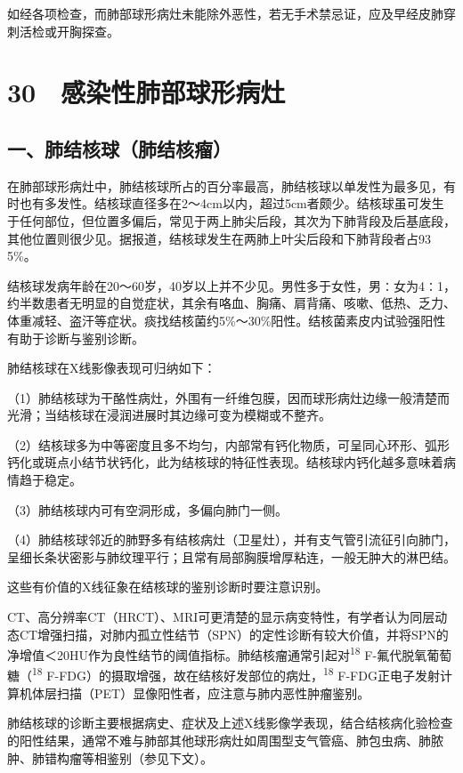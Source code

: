 如经各项检查，而肺部球形病灶未能除外恶性，若无手术禁忌证，应及早经皮肺穿刺活检或开胸探查。

\protect\hypertarget{text00089.html}{}{}

\section{30　感染性肺部球形病灶}

\subsection{一、肺结核球（肺结核瘤）}

在肺部球形病灶中，肺结核球所占的百分率最高，肺结核球以单发性为最多见，有时也有多发性。结核球直径多在2～4cm以内，超过5cm者颇少。结核球虽可发生于任何部位，但位置多偏后，常见于两上肺尖后段，其次为下肺背段及后基底段，其他位置则很少见。据报道，结核球发生在两肺上叶尖后段和下肺背段者占93
5\%。

结核球发病年龄在20～60岁，40岁以上并不少见。男性多于女性，男∶女为4∶1，约半数患者无明显的自觉症状，其余有咯血、胸痛、肩背痛、咳嗽、低热、乏力、体重减轻、盗汗等症状。痰找结核菌约5\%～30\%阳性。结核菌素皮内试验强阳性有助于诊断与鉴别诊断。

肺结核球在X线影像表现可归纳如下：

（1）肺结核球为干酪性病灶，外围有一纤维包膜，因而球形病灶边缘一般清楚而光滑；当结核球在浸润进展时其边缘可变为模糊或不整齐。

（2）结核球多为中等密度且多不均匀，内部常有钙化物质，可呈同心环形、弧形钙化或斑点小结节状钙化，此为结核球的特征性表现。结核球内钙化越多意味着病情趋于稳定。

（3）肺结核球内可有空洞形成，多偏向肺门一侧。

（4）肺结核球邻近的肺野多有结核病灶（卫星灶），并有支气管引流征引向肺门，呈细长条状密影与肺纹理平行；且常有局部胸膜增厚粘连，一般无肿大的淋巴结。

这些有价值的X线征象在结核球的鉴别诊断时要注意识别。

CT、高分辨率CT（HRCT）、MRI可更清楚的显示病变特性，有学者认为同层动态CT增强扫描，对肺内孤立性结节（SPN）的定性诊断有较大价值，并将SPN的净增值＜20HU作为良性结节的阈值指标。肺结核瘤通常引起对\textsuperscript{18}
F-氟代脱氧葡萄糖（\textsuperscript{18}
F-FDG）的摄取增强，故在结核好发部位的病灶，\textsuperscript{18}
F-FDG正电子发射计算机体层扫描（PET）显像阳性者，应注意与肺内恶性肿瘤鉴别。

肺结核球的诊断主要根据病史、症状及上述X线影像学表现，结合结核病化验检查的阳性结果，通常不难与肺部其他球形病灶如周围型支气管癌、肺包虫病、肺脓肿、肺错构瘤等相鉴别（参见下文）。


